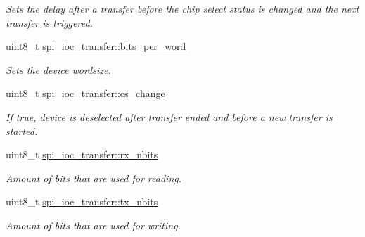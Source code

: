 \begin{DoxyCompactItemize}
\begin{DoxyCompactList}\small\item\em Sets the delay after a transfer before the chip select status is changed and the next transfer is triggered. \end{DoxyCompactList}\item 
\mbox{\label{group__SPILinux_ga7f3032fc0e3fcf7b7631ef651bb79317}} 
uint8\+\_\+t \mbox{\hyperlink{group__SPILinux_ga7f3032fc0e3fcf7b7631ef651bb79317}{spi\+\_\+ioc\+\_\+transfer\+::bits\+\_\+per\+\_\+word}}
\begin{DoxyCompactList}\small\item\em Sets the device wordsize. \end{DoxyCompactList}\item 
\mbox{\label{group__SPILinux_ga4bf035a0c6fdf0f478e6d005b56fdc38}} 
uint8\+\_\+t \mbox{\hyperlink{group__SPILinux_ga4bf035a0c6fdf0f478e6d005b56fdc38}{spi\+\_\+ioc\+\_\+transfer\+::cs\+\_\+change}}
\begin{DoxyCompactList}\small\item\em If true, device is deselected after transfer ended and before a new transfer is started. \end{DoxyCompactList}\item 
\mbox{\label{group__SPILinux_ga638652ff3eca7e5f30c5c09619ec4bce}} 
uint8\+\_\+t \mbox{\hyperlink{group__SPILinux_ga638652ff3eca7e5f30c5c09619ec4bce}{spi\+\_\+ioc\+\_\+transfer\+::rx\+\_\+nbits}}
\begin{DoxyCompactList}\small\item\em Amount of bits that are used for reading. \end{DoxyCompactList}\item 
\mbox{\label{group__SPILinux_gab6c226c9b46e6b4aaf9e7ddb325dcf24}} 
uint8\+\_\+t \mbox{\hyperlink{group__SPILinux_gab6c226c9b46e6b4aaf9e7ddb325dcf24}{spi\+\_\+ioc\+\_\+transfer\+::tx\+\_\+nbits}}
\begin{DoxyCompactList}\small\item\em Amount of bits that are used for writing. \end{DoxyCompactList}\item 
\mbox{\label{group__SPILinux_gaff60beee4311201da16eb1c65c1ad580}} 

\end{DoxyCompactItemize}
